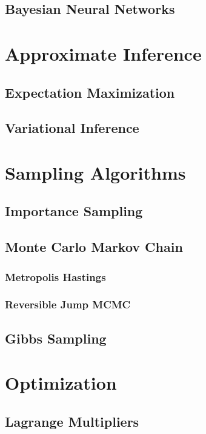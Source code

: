 \documentclass[12pt]{article}
\begin{document}
\subsection{Bayesian Neural Networks}
\section{Approximate Inference}

\subsection{Expectation Maximization}

\subsection{Variational Inference}

\section{Sampling Algorithms}

\subsection{Importance Sampling}

\subsection{Monte Carlo Markov Chain}

\subsubsection{Metropolis Hastings}

\subsubsection{Reversible Jump MCMC}

\subsection{Gibbs Sampling}

\section{Optimization}

\subsection{Lagrange Multipliers}
\end{document}
